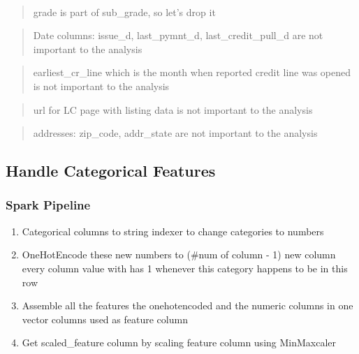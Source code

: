\documentclass[11pt]{article}
\providecommand{\tightlist}{%
      \setlength{\itemsep}{0pt}\setlength{\parskip}{0pt}}
\begin{document}
    \begin{center}
    \end{center}
    { \hspace*{\fill} \\}
    
    \begin{quote}
grade is part of sub\_grade, so let's drop it
\end{quote}

\begin{quote}
Date columns: issue\_d, last\_pymnt\_d, last\_credit\_pull\_d are not
important to the analysis
\end{quote}

\begin{quote}
earliest\_cr\_line which is the month when reported credit line was
opened is not important to the analysis
\end{quote}

\begin{quote}
url for LC page with listing data is not important to the analysis
\end{quote}

\begin{quote}
addresses: zip\_code, addr\_state are not important to the analysis
\end{quote}

    \hypertarget{handle-categorical-features}{%
\subsection{Handle Categorical
Features}\label{handle-categorical-features}}

    \hypertarget{spark-pipeline}{%
\subsubsection{Spark Pipeline}\label{spark-pipeline}}

\begin{enumerate}
\def\labelenumi{\arabic{enumi}.}
\tightlist
\item
  Categorical columns to string indexer to change categories to numbers
\item
  OneHotEncode these new numbers to (\#num of column - 1) new column
  every column value with has 1 whenever this category happens to be in
  this row
\item
  Assemble all the features the onehotencoded and the numeric columns in
  one vector columns used as feature column
\item
  Get scaled\_feature column by scaling feature column using MinMaxcaler
\end{enumerate}
\end{document}
